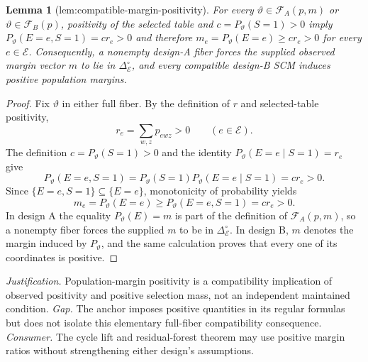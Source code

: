 \documentclass{article}
\newtheorem{lemma}{Lemma}
\begin{document}
\begin{lemma}[lem:compatible-margin-positivity]\label{lem:compatible-margin-positivity}
For every \(\vartheta\in\mathcal F_A(p,m)\) or \(\vartheta\in\mathcal F_B(p)\), positivity of the selected table and \(c=P_{\vartheta}(S=1)>0\) imply \(P_{\vartheta}(E=e,S=1)=c r_e>0\) and therefore \(m_e=P_{\vartheta}(E=e)\ge c r_e>0\) for every \(e\in\mathcal E\). Consequently, a nonempty design-A fiber forces the supplied observed margin vector \(m\) to lie in \(\Delta_{\mathcal E}^{\circ}\), and every compatible design-B SCM induces positive population margins.
\end{lemma}
\begin{proof}
Fix \(\vartheta\) in either full fiber.  By the definition of \(r\) and selected-table positivity,
\[
r_e=\sum_{w,z}p_{ewz}>0\qquad(e\in\mathcal E).
\]
The definition \(c=P_{\vartheta}(S=1)>0\) and the identity
\(P_{\vartheta}(E=e\mid S=1)=r_e\) give
\[
P_{\vartheta}(E=e,S=1)
=P_{\vartheta}(S=1)P_{\vartheta}(E=e\mid S=1)
=c r_e>0.
\]
Since \(\{E=e,S=1\}\subseteq\{E=e\}\), monotonicity of probability yields
\[
m_e=P_{\vartheta}(E=e)\ge P_{\vartheta}(E=e,S=1)=c r_e>0.
\]
In design A the equality \(P_{\vartheta}(E)=m\) is part of the definition of \(\mathcal F_A(p,m)\), so a nonempty fiber forces the supplied \(m\) to be in \(\Delta_{\mathcal E}^{\circ}\).  In design B, \(m\) denotes the margin induced by \(P_{\vartheta}\), and the same calculation proves that every one of its coordinates is positive.
\end{proof}
\par\smallskip\noindent \textit{Justification.} Population-margin positivity is a compatibility implication of observed positivity and positive selection mass, not an independent maintained condition. \textit{Gap.} The anchor imposes positive quantities in its regular formulas but does not isolate this elementary full-fiber compatibility consequence. \textit{Consumer.} The cycle lift and residual-forest theorem may use positive margin ratios without strengthening either design's assumptions.
\end{document}
